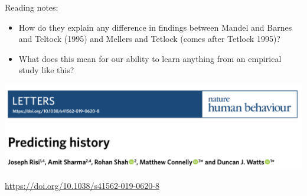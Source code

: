 \documentclass[aspectratio=169]{beamer}
\begin{document}
\begin{frame}

Reading notes:
\begin{itemize}
\item How do they explain any difference in findings between Mandel and Barnes and Teltock (1995) and Mellers and Tetlock (comes after Tetlock 1995)?
\pause
\item What does this mean for our ability to learn anything from an empirical study like this?
\end{itemize}

\end{frame}
\begin{frame}

\begin{center}
\includegraphics[width=\textwidth]{figures/risi_predicting_2019_title}
\end{center}

\vfill
\url{https://doi.org/10.1038/s41562-019-0620-8}

\end{frame}
\end{document}
